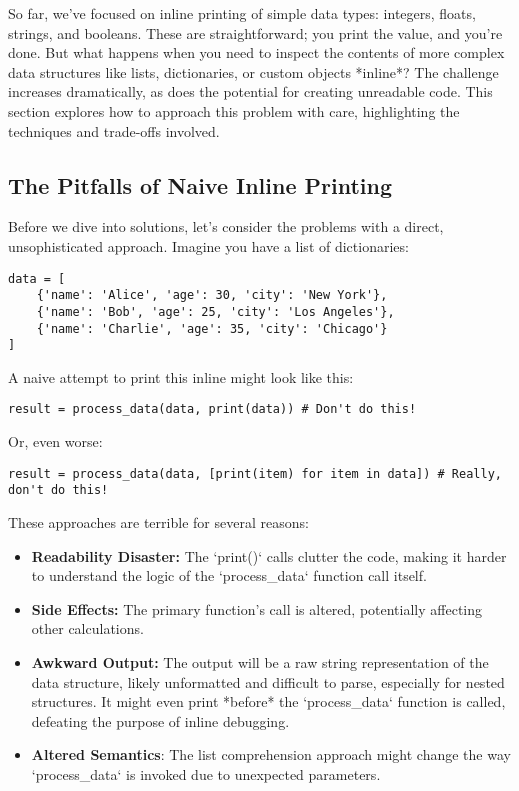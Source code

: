 \documentclass{article}
\begin{document}
{{{{So far, we've focused on inline printing of simple data types: integers, floats, strings, and booleans. These are straightforward; you print the value, and you're done. But what happens when you need to inspect the contents of more complex data structures like lists, dictionaries, or custom objects *inline*? The challenge increases dramatically, as does the potential for creating unreadable code. This section explores how to approach this problem with care, highlighting the techniques and trade-offs involved.

\subsection*{The Pitfalls of Naive Inline Printing}

Before we dive into solutions, let's consider the problems with a direct, unsophisticated approach. Imagine you have a list of dictionaries:

\begin{verbatim}
data = [
    {'name': 'Alice', 'age': 30, 'city': 'New York'},
    {'name': 'Bob', 'age': 25, 'city': 'Los Angeles'},
    {'name': 'Charlie', 'age': 35, 'city': 'Chicago'}
]
\end{verbatim}

A naive attempt to print this inline might look like this:

\begin{verbatim}
result = process_data(data, print(data)) # Don't do this!
\end{verbatim}

Or, even worse:

\begin{verbatim}
result = process_data(data, [print(item) for item in data]) # Really, don't do this!
\end{verbatim}

These approaches are terrible for several reasons:

\begin{itemize}
    \item \textbf{Readability Disaster:}  The `print()` calls clutter the code, making it harder to understand the logic of the `process_data` function call itself.
    \item \textbf{Side Effects:} The primary function's call is altered, potentially affecting other calculations.
    \item \textbf{Awkward Output:}  The output will be a raw string representation of the data structure, likely unformatted and difficult to parse, especially for nested structures.  It might even print *before* the `process_data` function is called, defeating the purpose of inline debugging.
    \item \textbf{Altered Semantics}: The list comprehension approach might change the way `process_data` is invoked due to unexpected parameters.
\end{itemize}

}}}}
\end{document}
